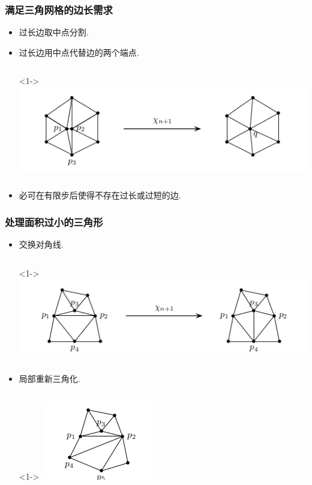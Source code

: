 \documentclass[UTF8]{ctexbeamer}	%
\theoremstyle{plain}
\theoremstyle{definition}
\theoremstyle{remark}
\numberwithin{equation}{section}
\begin{document}
\begin{frame}
    \frametitle{满足三角网格的边长需求}
    \begin{itemize}
    \item 过长边取中点分割.
    \item 过长边用中点代替边的两个端点.
    \begin{columns}
        <1->
        \includegraphics[width = \textwidth]{fig/combinePoint.png}
     \end{columns}
     \item 必可在有限步后使得不存在过长或过短的边.
    \end{itemize}
    
\end{frame}


\begin{frame}
    \frametitle{处理面积过小的三角形}
    \begin{itemize}
        \item 交换对角线.
        \begin{columns}
            <1->
            \includegraphics[width = \textwidth]{fig/swapcross.png}
         \end{columns}
        \item 局部重新三角化.
        \begin{columns}
            <1->
            \includegraphics[width = \textwidth]{fig/reTriangule.png}
         \end{columns}
    \end{itemize}
\end{frame}
\end{document}
